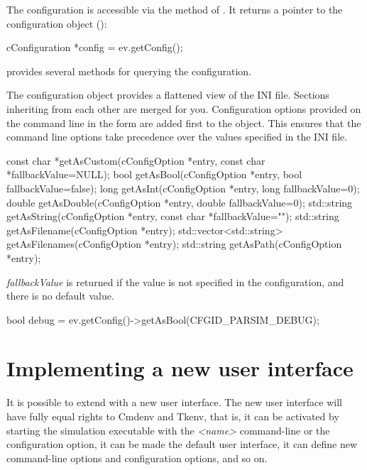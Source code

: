 The configuration is accessible via the  method of .
It returns a pointer to the configuration object ():

\begin{cpp}
cConfiguration *config = ev.getConfig();
\end{cpp}

 provides several methods for querying the configuration.

\begin{note}
The configuration object provides a flattened view of the INI file. Sections
inheriting from each other are merged for you. Configuration options provided
on the command line in the form  are added first to the object.
This ensures that the command line options take precedence over the values specified
in the INI file.
\end{note}

\begin{cpp}
const char *getAsCustom(cConfigOption *entry, const char *fallbackValue=NULL);
bool getAsBool(cConfigOption *entry, bool fallbackValue=false);
long getAsInt(cConfigOption *entry, long fallbackValue=0);
double getAsDouble(cConfigOption *entry, double fallbackValue=0);
std::string getAsString(cConfigOption *entry, const char *fallbackValue="");
std::string getAsFilename(cConfigOption *entry);
std::vector<std::string> getAsFilenames(cConfigOption *entry);
std::string getAsPath(cConfigOption *entry);
\end{cpp}

\textit{fallbackValue} is returned if the value is not specified in the configuration,
and there is no default value.

\begin{cpp}
bool debug = ev.getConfig()->getAsBool(CFGID_PARSIM_DEBUG);
\end{cpp}


\section{Implementing a new user interface}
\label{sec:plugin-exts:userinterface}

It is possible to extend {\opp} with a new user interface. The new
user interface will have fully equal rights to Cmdenv and Tkenv, that is,
it can be activated by starting the simulation executable with the
 \textit{<name>} command-line or the 
configuration option, it can be made the default user interface,
it can define new command-line options and configuration options,
and so on.

